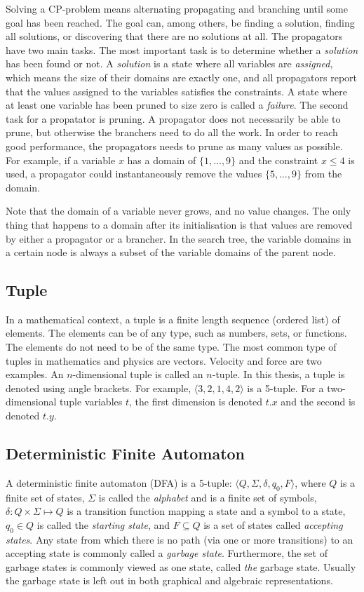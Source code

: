 \documentclass[a4paper,11pt]{article}
\begin{document}
Solving a CP-problem means alternating propagating and branching until some goal has been reached. The goal can, among others, be finding a solution, finding all solutions, or discovering that there are no solutions at all. The propagators have two main tasks. The most important task is to determine whether a \textit{solution} has been found or not. A \textit{solution} is a state where all variables are \textit{assigned}, which means the size of their domains are exactly one, and all propagators report that the values assigned to the variables satisfies the constraints. A state where at least one variable has been pruned to size zero is called a \textit{failure}. The second task for a propatator is pruning. A propagator does not necessarily be able to prune, but otherwise the branchers need to do all the work. In order to reach good performance, the propagators needs to prune as many values as possible. For example, if a variable $x$ has a domain of $\{1,\ldots,9\}$ and the constraint $x\le 4$ is used, a propagator could instantaneously remove the values $\{5,\ldots,9\}$ from the domain.

Note that the domain of a variable never grows, and no value changes. The only thing that happens to a domain after its initialisation is that values are removed by either a propagator or a brancher. In the search tree, the variable domains in a certain node is always a subset of the variable domains of the parent node. 

\subsection{Tuple}
In a mathematical context, a tuple is a finite length sequence (ordered list) of elements. The elements can be of any type, such as numbers, sets, or functions. The elements do not need to be of the same type. The most common type of tuples in mathematics and physics are vectors. Velocity and force are two examples. An $n$-dimensional tuple is called an $n$-tuple. In this thesis, a tuple is denoted using angle brackets. For example, $\langle 3, 2, 1, 4, 2 \rangle$ is a 5-tuple. For a two-dimensional tuple variables $t$, the first dimension is denoted $t.x$ and the second is denoted $t.y$.

\subsection{Deterministic Finite Automaton}
\label{sec:dfa}
A deterministic finite automaton (DFA) is a 5-tuple: $\langle Q,\Sigma,\delta,q_0, F\rangle$, where $Q$ is a finite set of states, $\Sigma$ is called the \textit{alphabet} and is a finite set of symbols, $\delta : Q \times \Sigma \mapsto Q$  is a transition function mapping a state and a symbol to a state, $q_0\in Q$ is called the \textit{starting state}, and $F\subseteq Q$  is a set of states called \textit{accepting states}. Any state from which there is no path (via one or more transitions) to an accepting state is commonly called a \textit{garbage state}. Furthermore, the set of garbage states is commonly viewed as one state, called \textit{the} garbage state. Usually the garbage state is left out in both graphical and algebraic representations. 
\end{document}

